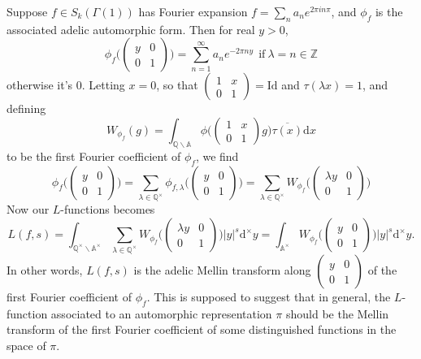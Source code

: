 \documentclass[12pt,a4paper,english]{article}
\theoremstyle{plain}
\theoremstyle{definition}
\begin{document}
Suppose $f\in S_{k}(\Gamma(1))$ has Fourier expansion $f=\sum_{n}a_{n}e^{2\pi i n\pi}$, and $\phi_{f}$ is the associated adelic automorphic form. Then for real $y>0$, 
\begin{equation*}
    \phi_{f}\bigg(\begin{pmatrix}
    y&0\\
    0&1
    \end{pmatrix}\bigg)=\sum_{n=1}^{\infty} a_{n}e^{-2\pi ny}\ \ \text{if}\ \lambda=n\in\mathbb{Z}
\end{equation*}
otherwise it's 0.
Letting $x=0$, so that $\begin{pmatrix}
1&x\\
0&1
\end{pmatrix}=\text{Id}$ and $\tau(\lambda x)=1$, and defining 
\begin{equation*}
    W_{\phi_{f}}(g)=\int_{\mathbb{Q}\backslash\mathbb{A}}\phi\bigg(\begin{pmatrix}
    1&x\\
    0&1
    \end{pmatrix}g\bigg)\overline{\tau(x)}\text{d}x
\end{equation*}
to be the first Fourier coefficient of $\phi_{f}$, we find 
\begin{equation*}
    \phi_{f}\bigg(\begin{pmatrix}
    y&0\\
    0&1
    \end{pmatrix}\bigg)=\sum_{\lambda\in\mathbb{Q}^{\times}}\phi_{f,\lambda}\bigg(\begin{pmatrix}
    y&0\\
    0&1
    \end{pmatrix}\bigg)=\sum_{\lambda\in\mathbb{Q}^{\times}}W_{\phi_{f}}\bigg(\begin{pmatrix}
    \lambda y&0\\
    0&1
    \end{pmatrix}\bigg)
\end{equation*}
Now our $L$-functions becomes
\begin{equation*}
    L(f,s)=\int_{\mathbb{Q}^{\times}\backslash\mathbb{A}^{\times}}\sum_{\lambda\in\mathbb{Q}^{\times}}W_{\phi_{f}}\bigg(\begin{pmatrix}
    \lambda y&0\\
    0&1
    \end{pmatrix}\bigg)|y|^{s}\text{d}^{\times}y=\int_{\mathbb{A}^{\times}}W_{\phi_{f}}\bigg(\begin{pmatrix}
    y&0\\
    0&1
    \end{pmatrix}\bigg)|y|^{s}\text{d}^{\times}y.
\end{equation*}
In other words, $L(f,s)$ is the adelic Mellin transform along $\begin{pmatrix}
y&0\\
0&1
\end{pmatrix}$ of the first Fourier coefficient of $\phi_{f}$. This is supposed to suggest that in general, the $L$-function associated to an automorphic representation $\pi$ should be the Mellin transform of the first Fourier coefficient of some distinguished functions in the space of $\pi$.
\end{document}

